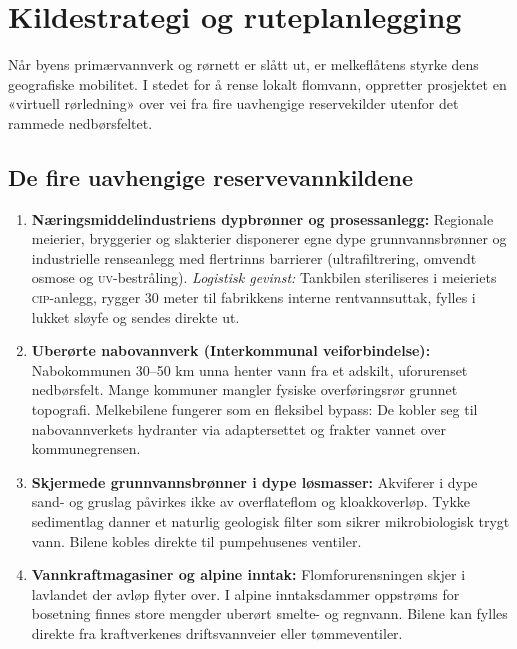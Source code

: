 \section{Kildestrategi og ruteplanlegging}
\label{sec:kildestrategi}

Når byens primærvannverk og rørnett er slått ut, er melkeflåtens styrke dens geografiske mobilitet. I stedet for å rense lokalt flomvann, oppretter prosjektet en «virtuell rørledning» over vei fra fire uavhengige reservekilder utenfor det rammede nedbørsfeltet.

\subsection{De fire uavhengige reservevannkildene}
\begin{enumerate}[leftmargin=1.5em, itemsep=0.25em]
    \item \textbf{Næringsmiddelindustriens dypbrønner og prosessanlegg:}
    Regionale meierier, bryggerier og slakterier disponerer egne dype grunnvannsbrønner og industrielle renseanlegg med flertrinns barrierer (ultrafiltrering, omvendt osmose og \textsc{uv}-bestråling). 
    \textit{Logistisk gevinst:} Tankbilen steriliseres i meieriets \textsc{cip}-anlegg, rygger 30 meter til fabrikkens interne rentvannsuttak, fylles i lukket sløyfe og sendes direkte ut.
    \item \textbf{Uberørte nabovannverk (Interkommunal veiforbindelse):}
    Nabokommunen 30--50 km unna henter vann fra et adskilt, uforurenset nedbørsfelt. Mange kommuner mangler fysiske overføringsrør grunnet topografi. Melkebilene fungerer som en fleksibel bypass: De kobler seg til nabovannverkets hydranter via adaptersettet og frakter vannet over kommunegrensen.
    \item \textbf{Skjermede grunnvannsbrønner i dype løsmasser:}
    Akviferer i dype sand- og gruslag påvirkes ikke av overflateflom og kloakkoverløp. Tykke sedimentlag danner et naturlig geologisk filter som sikrer mikrobiologisk trygt vann. Bilene kobles direkte til pumpehusenes ventiler.
    \item \textbf{Vannkraftmagasiner og alpine inntak:}
    Flomforurensningen skjer i lavlandet der avløp flyter over. I alpine inntaksdammer oppstrøms for bosetning finnes store mengder uberørt smelte- og regnvann. Bilene kan fylles direkte fra kraftverkenes driftsvannveier eller tømmeventiler.
\end{enumerate}

